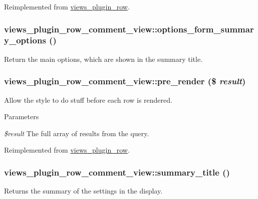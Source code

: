 Reimplemented from \hyperlink{classviews__plugin__row_a6914c39d64977a0aa71da39cc1af004e}{views\_\-plugin\_\-row}.\hypertarget{classviews__plugin__row__comment__view_a6a7748a2ceb8f5ebac1d59f94800b89a}{
\subsubsection[{options\_\-form\_\-summary\_\-options}]{\setlength{\rightskip}{0pt plus 5cm}views\_\-plugin\_\-row\_\-comment\_\-view::options\_\-form\_\-summary\_\-options ()}}
\label{classviews__plugin__row__comment__view_a6a7748a2ceb8f5ebac1d59f94800b89a}
Return the main options, which are shown in the summary title. \hypertarget{classviews__plugin__row__comment__view_a0cb891a0afff2975d9a04c9d879ee5a5}{
\subsubsection[{pre\_\-render}]{\setlength{\rightskip}{0pt plus 5cm}views\_\-plugin\_\-row\_\-comment\_\-view::pre\_\-render (\$ {\em result})}}
\label{classviews__plugin__row__comment__view_a0cb891a0afff2975d9a04c9d879ee5a5}
Allow the style to do stuff before each row is rendered.


\begin{DoxyParams}{Parameters}
\item[{\em \$result}]The full array of results from the query. \end{DoxyParams}


Reimplemented from \hyperlink{classviews__plugin__row_ae49a23f750874e4b3d294aa3a20ecd64}{views\_\-plugin\_\-row}.\hypertarget{classviews__plugin__row__comment__view_a8f87e8baac2cbe47fa187c739decc88f}{
\subsubsection[{summary\_\-title}]{\setlength{\rightskip}{0pt plus 5cm}views\_\-plugin\_\-row\_\-comment\_\-view::summary\_\-title ()}}
\label{classviews__plugin__row__comment__view_a8f87e8baac2cbe47fa187c739decc88f}
Returns the summary of the settings in the display. 

